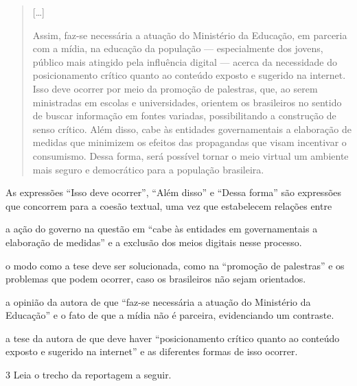 \begin{quote}
{[}\ldots{}{]}

Assim, faz-se necessária a atuação do Ministério da Educação, em
parceria com a mídia, na educação da população --- especialmente dos
jovens, público mais atingido pela influência digital --- acerca da
necessidade do posicionamento crítico quanto ao conteúdo exposto e
sugerido na internet. Isso deve ocorrer por meio da promoção de
palestras, que, ao serem ministradas em escolas e universidades,
orientem os brasileiros no sentido de buscar informação em fontes
variadas, possibilitando a construção de senso crítico. Além disso, cabe
às entidades governamentais a elaboração de medidas que minimizem os
efeitos das propagandas que visam incentivar o consumismo. Dessa forma,
será possível tornar o meio virtual um ambiente mais seguro e
democrático para a população brasileira.

\end{quote}

As expressões ``Isso deve ocorrer'', ``Além disso'' e ``Dessa forma''
são expressões que concorrem para a coesão textual, uma vez que
estabelecem relações entre

\begin{escolha}
\item a ação do governo na questão em ``cabe às entidades em
governamentais a elaboração de medidas'' e a exclusão dos meios digitais
nesse processo.

\item o modo como a tese deve ser solucionada, como na ``promoção de
palestras'' e os problemas que podem ocorrer, caso os brasileiros não
sejam orientados.

\item a opinião da autora de que ``faz-se necessária a atuação do
Ministério da Educação'' e o fato de que a mídia não é parceira,
evidenciando um contraste.

\item a tese da autora de que deve haver ``posicionamento crítico quanto
ao conteúdo exposto e sugerido na internet'' e as diferentes formas de
isso ocorrer.
\end{escolha}



\num{3} Leia o trecho da reportagem a seguir.

